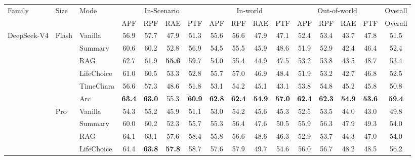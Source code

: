 \documentclass{llmxive}
\providecommand{\arraystretch}{0.95}
\begin{document}
\begin{table}[t]
\centering
\scriptsize
\setlength{\tabcolsep}{5pt}
\renewcommand{\arraystretch}{0.85}
\setlength{\aboverulesep}{0.2ex}
\setlength{\belowrulesep}{0.2ex}
\begin{tabular}{lllccccccccccccc}
\toprule
Family & Size & Mode & \multicolumn{4}{c}{In-Scenario} & \multicolumn{4}{c}{In-world} & \multicolumn{4}{c}{Out-of-world} & Overall \\
\cmidrule(lr){4-7} \cmidrule(lr){8-11} \cmidrule(lr){12-15} \cmidrule(lr){16-16}
 & & & APF & RPF & RAE & PTF & APF & RPF & RAE & PTF & APF & RPF & RAE & PTF & Overall \\
\midrule
\multirow[t]{12}{*}{DeepSeek-V4} & \multirow[t]{6}{*}{Flash} & Vanilla & 56.9 & 57.7 & 47.9 & 51.3 & 55.6 & 56.6 & 47.9 & 47.1 & 52.4 & 53.4 & 43.7 & 47.8 & 51.5 \\
 &  & Summary & 60.6 & 60.2 & 52.8 & 56.9 & 54.5 & 55.5 & 45.9 & 48.6 & 51.9 & 52.9 & 42.4 & 46.4 & 52.4 \\
 &  & RAG & 62.7 & 61.9 & \textbf{55.6} & 59.7 & 54.0 & 55.4 & 44.9 & 47.5 & 53.2 & 53.8 & 43.5 & 48.7 & 53.4 \\
 &  & LifeChoice & 61.0 & 60.5 & 53.3 & 52.8 & 55.7 & 57.0 & 46.9 & 48.4 & 51.9 & 53.2 & 42.7 & 46.8 & 52.5 \\
 &  & TimeChara & 56.6 & 57.3 & 48.6 & 51.8 & 53.1 & 54.2 & 45.1 & 43.1 & 53.8 & 54.8 & 45.2 & 45.8 & 50.8 \\
 &  & \cellcolor{yellow!15} Arc & \cellcolor{yellow!15} \textbf{63.4} & \cellcolor{yellow!15} \textbf{63.0} & \cellcolor{yellow!15} 55.3 & \cellcolor{yellow!15} \textbf{60.9} & \cellcolor{yellow!15} \textbf{62.8} & \cellcolor{yellow!15} \textbf{62.4} & \cellcolor{yellow!15} \textbf{54.9} & \cellcolor{yellow!15} \textbf{57.0} & \cellcolor{yellow!15} \textbf{62.4} & \cellcolor{yellow!15} \textbf{62.3} & \cellcolor{yellow!15} \textbf{54.9} & \cellcolor{yellow!15} \textbf{53.6} & \cellcolor{yellow!15} \textbf{59.4} \\
\cmidrule(l){2-16}
 & \multirow[t]{6}{*}{Pro} & Vanilla & 54.3 & 55.2 & 45.9 & 51.1 & 53.0 & 54.2 & 45.6 & 45.3 & 52.5 & 53.5 & 44.0 & 43.0 & 49.8 \\
 &  & Summary & 60.0 & 60.2 & 52.3 & 55.7 & 55.3 & 56.4 & 47.6 & 50.5 & 55.9 & 56.3 & 47.9 & 49.3 & 54.0 \\
 &  & RAG & 64.1 & 63.1 & 57.6 & 58.4 & 55.8 & 56.6 & 48.6 & 46.3 & 52.9 & 53.7 & 44.3 & 47.0 & 54.0 \\
 &  & LifeChoice & 64.4 & \textbf{63.8} & \textbf{57.8} & 58.7 & 57.6 & 57.9 & 49.7 & 54.6 & 56.0 & 56.7 & 48.2 & 48.5 & 56.2 \\

\end{tabular}
\end{table}
\end{document}

